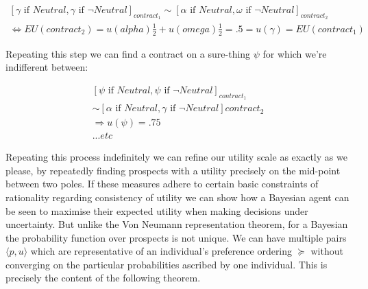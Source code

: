 \documentclass[]{tufte-book}
\theoremstyle{definition}
\theoremstyle{definition}
\theoremstyle{definition}
\theoremstyle{remark}
\begin{document}
\begin{equation} \begin{split} [\gamma \text{ if } Neutral, \gamma \text{ if } \neg Neutral]_{contract_1} \sim [\alpha \text{ if } Neutral, \omega \text{ if } \neg Neutral ]_{contract_2} \\ \Leftrightarrow EU(contract_{2}) = u(alpha)\frac{1}{2} + u(omega)\frac{1}{2} = .5  = u(\gamma) = EU(contract_{1}) \end{split} \end{equation}

Repeating this step we can find a contract on a sure-thing \(\psi\) for which we're indifferent between:

\begin{equation} \begin{split} [\psi \text{ if } Neutral,\psi \text{ if } \neg Neutral]_{contract_1} \\  \sim [\alpha \text{ if } Neutral, \gamma \text{ if } \neg Neutral ]{contract_2} \\ \Rightarrow u(\psi) = .75 \\ . . . etc \end{split} \end{equation}

Repeating this process indefinitely we can refine our utility scale as exactly as we please, by repeatedly finding prospects with a utility precisely on the mid-point between two poles. If these measures adhere to certain basic constraints of rationality regarding consistency of utility we can show how a Bayesian agent can be seen to maximise their expected utility when making decisions under uncertainty. But unlike the Von Neumann representation theorem, for a Bayesian the probability function over prospects is not unique. We can have multiple pairs \(\langle p, u \rangle\) which are representative of an individual's preference ordering \(\succeq\) without converging on the particular probabilities ascribed by one individual. This is precisely the content of the following theorem.
\end{document}
